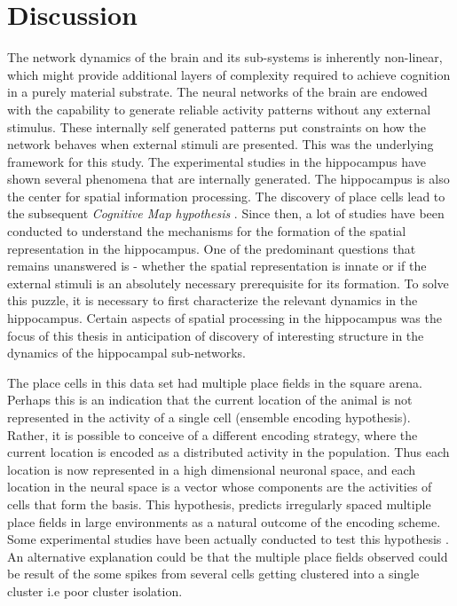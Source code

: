 \chapter{Discussion}

The network dynamics of the brain and its sub-systems is inherently non-linear, which might provide additional layers of complexity required to achieve cognition in a purely material substrate. The neural networks of the brain are endowed with the capability to generate reliable activity patterns without any external stimulus. These internally self generated patterns put constraints on how the network behaves when external stimuli are presented. This was the underlying framework for this study. The experimental studies in the hippocampus have shown several phenomena that are internally generated. The hippocampus is also the center for spatial information processing. The discovery of place cells \cite{O'Keefe1971a} lead to the subsequent \emph{Cognitive Map hypothesis} \cite{Street}. Since then, a lot of studies have been conducted to understand the mechanisms for the formation of the spatial representation in the hippocampus. One of the predominant questions that remains unanswered is - whether the spatial representation is innate or if the external stimuli is an absolutely necessary prerequisite for its formation. To solve this puzzle, it is necessary to first characterize the relevant dynamics in the hippocampus. Certain aspects of spatial processing in the hippocampus was the focus of this thesis in anticipation of discovery of interesting structure in the dynamics of the hippocampal sub-networks. 

The place cells in this data set had multiple place fields in the square arena. Perhaps this is an indication that the current location of the animal is not represented in the activity of a single cell (ensemble encoding hypothesis). Rather, it is possible to conceive of a different encoding strategy, where the current location is encoded as a distributed activity in the population. Thus each location is now represented in a high dimensional neuronal space, and each location in the neural space is a vector whose components are the activities of cells that form the basis. This hypothesis, predicts irregularly spaced multiple place fields in large environments as a natural outcome of the encoding scheme. Some experimental studies have been actually conducted to test this hypothesis \cite{Fenton2008}.  An alternative explanation could be that the multiple place fields observed could be result of the some spikes from several cells getting clustered into a single cluster i.e poor cluster isolation.

